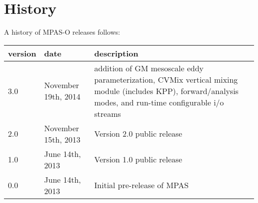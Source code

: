 \chapter*{History}
\label{chap:history}

A history of MPAS-O releases follows: \\


\begin{tabular}{ll p{4in}} 
\hline\hline version & date & description  \\
\hline 
3.0 & November 19th, 2014 & addition of GM mesoscale eddy parameterization, CVMix vertical mixing module (includes KPP), forward/analysis modes, and run-time configurable i/o streams \\
\hline 
2.0 & November 15th, 2013 & Version 2.0 public release \\
\hline 
1.0 & June 14th, 2013 & Version 1.0 public release \\
\hline 
0.0 & June 14th, 2013 & Initial pre-release of MPAS \\
\hline 
\end{tabular} 



\newpage
